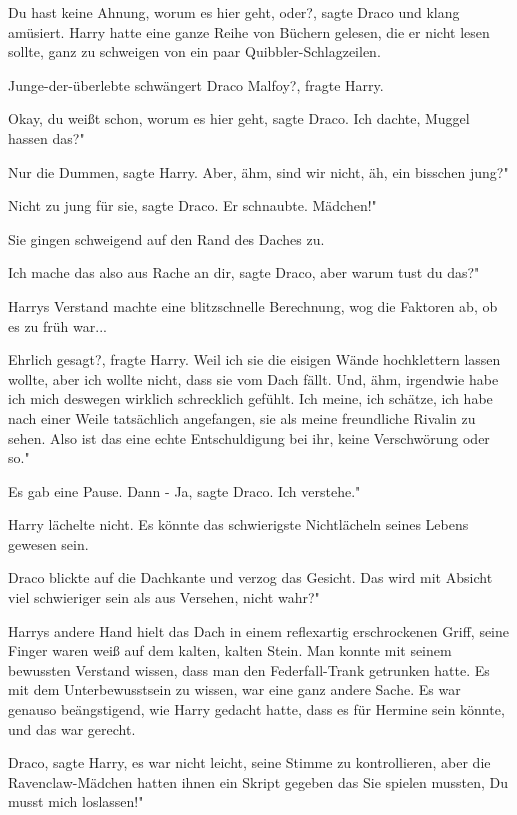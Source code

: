 \glqq{}Du hast keine Ahnung, worum es hier geht, oder?\grqq{}, sagte Draco und
klang amüsiert. Harry hatte eine ganze Reihe von Büchern gelesen, die er nicht
lesen sollte, ganz zu schweigen von ein paar Quibbler-Schlagzeilen.

\glqq{}Junge-der-überlebte schwängert Draco Malfoy?\grqq{}, fragte Harry.

\glqq{}Okay, du weißt schon, worum es hier geht\grqq{}, sagte Draco. \glqq{}Ich
dachte, Muggel hassen das?"

\glqq{}Nur die Dummen\grqq{}, sagte Harry. \glqq{}Aber, ähm, sind wir nicht, äh,
ein bisschen jung?"

\glqq{}Nicht zu jung für sie\grqq{}, sagte Draco. Er schnaubte. \glqq{}Mädchen!"

Sie gingen schweigend auf den Rand des Daches zu.

\glqq{}Ich mache das also aus Rache an dir\grqq{}, sagte Draco, \glqq{}aber warum
tust du das?"

Harrys Verstand machte eine blitzschnelle Berechnung, wog die Faktoren ab, ob es
zu früh war...

\glqq{}Ehrlich gesagt?\grqq{}, fragte Harry. \glqq{}Weil ich sie die eisigen Wände
hochklettern lassen wollte, aber ich wollte nicht, dass sie vom Dach fällt. Und,
ähm, irgendwie habe ich mich deswegen wirklich schrecklich gefühlt. Ich meine,
ich schätze, ich habe nach einer Weile tatsächlich angefangen, sie als meine
freundliche Rivalin zu sehen. Also ist das eine echte Entschuldigung bei ihr,
keine Verschwörung oder so."

Es gab eine Pause. Dann - \glqq{}Ja\grqq{}, sagte Draco. \glqq{}Ich verstehe."

Harry lächelte nicht. Es könnte das schwierigste Nichtlächeln seines Lebens
gewesen sein.

Draco blickte auf die Dachkante und verzog das Gesicht. \glqq{}Das wird mit
Absicht viel schwieriger sein als aus Versehen, nicht wahr?"

Harrys andere Hand hielt das Dach in einem reflexartig erschrockenen Griff,
seine Finger waren weiß auf dem kalten, kalten Stein. Man konnte mit seinem
bewussten Verstand wissen, dass man den Federfall-Trank getrunken hatte. Es mit
dem Unterbewusstsein zu wissen, war eine ganz andere Sache. Es war genauso
beängstigend, wie Harry gedacht hatte, dass es für Hermine sein könnte, und das
war gerecht.

\glqq{}Draco\grqq{}, sagte Harry, es war nicht leicht, seine Stimme zu
kontrollieren, aber die Ravenclaw-Mädchen hatten ihnen ein Skript gegeben das
Sie spielen mussten, \glqq{}Du musst mich loslassen!"

